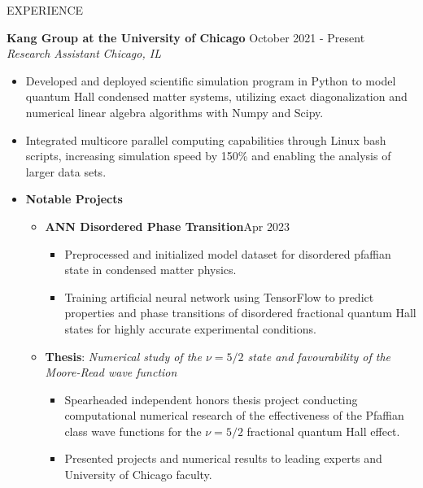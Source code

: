 \documentclass{resume} %
\begin{document}
\vspace{-0.5em}
\begin{rSection}{EXPERIENCE}

\textbf{Kang Group at the University of Chicago} \hfill October 2021 - Present\\
\textit{Research Assistant} \hfill \textit{Chicago, IL}
\vspace{-0.6em}
 \begin{itemize}
   \itemsep -5.8pt {}
   \item Developed and deployed scientific simulation program in Python to model quantum Hall condensed matter systems, utilizing exact diagonalization and numerical linear algebra algorithms with Numpy and Scipy.
   \item Integrated multicore parallel computing capabilities through Linux bash scripts, increasing simulation speed by 150\% and enabling the analysis of larger data sets.
   \item \textbf{Notable Projects}\begin{itemize}
      \item \vspace{-0.6em} \textbf{ANN Disordered Phase Transition}\hfill Apr 2023
      \begin{itemize}
         \vspace{-0.6em}
         \itemsep -5.8pt {}
         \item Preprocessed and initialized model dataset for disordered pfaffian state in condensed matter physics.
         \item Training artificial neural network using TensorFlow to predict properties and phase transitions of disordered fractional quantum Hall states for highly accurate experimental conditions.
      \end{itemize}
      \item \vspace{-0.6em}\textbf{Thesis}: \textit{Numerical study of the $\nu=5/2$ state and favourability of the Moore-Read wave function}
      \begin{itemize}
         \vspace{-0.6em}
         \itemsep -5.8pt {}
         \item Spearheaded independent honors thesis project conducting computational numerical research of the effectiveness of the Pfaffian class wave functions for the $\nu=5/2$ fractional quantum Hall effect.
         \item Presented projects and numerical results to leading experts and University of Chicago faculty.
          

\end{itemize}
\end{itemize}
\end{itemize}
\end{rSection}
\end{document}
